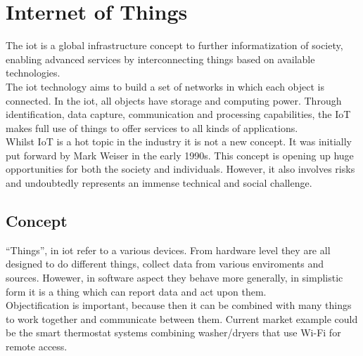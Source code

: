 \section{Internet of Things} 
The \gls{iot} is a global infrastructure concept to further informatization of society, enabling advanced services by interconnecting things based on available technologies.\\The \gls{iot} technology aims to build a set of networks in which each object is connected. In the \gls{iot}, all objects have storage and computing power\cite{7263548}. Through identification, data capture, communication and processing capabilities, the IoT makes full use of things to offer services to all kinds of applications. \\Whilst IoT is a hot topic in the industry it is not a new concept. It was initially put forward by Mark Weiser in the early 1990s. This concept is opening up huge opportunities for both the society and individuals. However, it also involves risks and undoubtedly represents an immense technical and social challenge.\cite{iot}
\subsection{Concept} %
\label{sub:concept}
``Things'', in \gls{iot} refer to a various devices. From hardware level they are all designed to do different things, collect data from various enviroments and sources. Howewer, in software aspect they behave more generally, in simplistic form it is a thing which can report data and act upon them. \\Objectification is important, because then it can be combined with many things to work together and communicate between them. Current market example could be the smart thermostat systems combining washer/dryers that use Wi-Fi for remote access.
